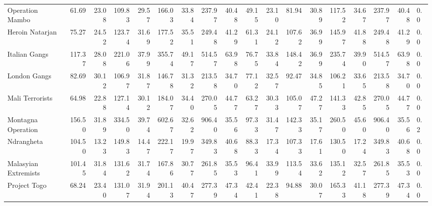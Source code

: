 \begin{tabular}{lrrrrrrrrrrrrrrrrl}
Operation Mambo      &             61.69 &  23.08 &  109.83 &  29.57 &  166.03 &  33.84 &  237.97 &  40.48 &            49.15 &   23.10 &   81.94 &   30.89 &  117.52 &   34.67 &  237.97 &  40.48 &        0.0 \\
Heroin Natarjan      &             75.27 &  24.52 &  123.74 &  31.69 &  177.52 &  35.51 &  249.48 &  41.29 &            61.31 &   24.12 &  107.62 &   36.99 &  145.97 &   41.88 &  249.48 &  41.29 &        0.0 \\
Italian Gangs        &            117.37 &  28.08 &  221.06 &  37.99 &  355.74 &  49.17 &  514.57 &  63.98 &            76.75 &   33.84 &  148.42 &   36.99 &  235.74 &   39.90 &  514.57 &  63.98 &        0.0 \\
London Gangs         &             82.69 &  30.12 &  106.97 &  31.87 &  146.78 &  31.32 &  213.58 &  34.70 &            77.12 &   32.57 &   92.47 &   34.85 &  106.21 &   33.65 &  213.58 &  34.70 &        0.0 \\
Mali Terrorists      &             64.98 &  22.88 &  127.14 &  30.12 &  184.07 &  34.40 &  270.05 &  44.77 &            63.27 &   30.33 &  105.07 &   47.27 &  141.33 &   42.85 &  270.05 &  44.77 &        0.0 \\
Montagna Operation   &            156.50 &  31.89 &  334.50 &  39.74 &  602.67 &  32.62 &  906.40 &  35.56 &            97.33 &   31.47 &  142.33 &   35.17 &  260.50 &   45.60 &  906.40 &  35.56 &        0.2 \\
Ndrangheta           &            104.50 &  13.23 &  149.83 &  14.47 &  222.17 &  19.97 &  349.83 &  40.68 &            88.33 &   17.34 &  107.33 &   17.61 &  130.50 &   17.24 &  349.83 &  40.68 &        0.0 \\
Malasyian Extremists &            101.45 &  31.84 &  131.62 &  31.74 &  167.86 &  30.77 &  261.85 &  35.53 &            96.41 &   33.99 &  113.54 &   33.62 &  135.12 &   32.57 &  261.85 &  35.53 &        0.0 \\
Project Togo         &             68.24 &  23.40 &  131.07 &  31.94 &  201.13 &  40.47 &  277.39 &  47.34 &            42.41 &   22.38 &   94.88 &   30.07 &  165.33 &   41.18 &  277.39 &  47.34 &        0.0 \\
\bottomrule
\end{tabular}
